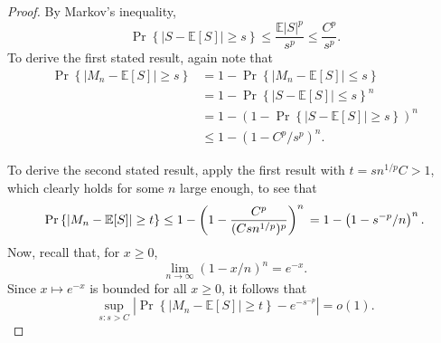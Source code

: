 \documentclass[
  12pt]{article}
\newcommand{\E}{\mathbb{E}}
\theoremstyle{plain}
\theoremstyle{plain}
\theoremstyle{definition}
\theoremstyle{plain}
\theoremstyle{remark}
\begin{document}
\begin{proof}
By Markov's inequality, \[
    \Pr\left\{ |S-\E[S]|\ge s\right\}\le \frac{\E|S|^p}{s^p}\le \frac{C^p}{s^p}.
\] To derive the first stated result, again note that \begin{align*}
\Pr\left\{|M_n-\E[S]|\ge s\right\}
& = 1 -\Pr\left\{|M_n-\E[S]|\le s\right\}               \\
& = 1-\Pr\left\{|S-\E[S]|\le s\right\}^n                \\
& = 1-\left(1-\Pr\left\{|S-\E[S]|\ge s\right\}\right)^n \\
& \le 1-(1-C^p/s^p)^n.
\end{align*}

To derive the second stated result, apply the first result with
\(t=sn^{1/p}C>1\), which clearly holds for some \(n\) large enough, to
see that \[
    \Pr\left\{|M_n-\E[S]|\ge t\right\}
    \le 1- \left(1-\frac{C^p}{(Csn^{1/p})^p}\right)^n \\
    = 1-\left(1-s^{-p}/n\right)^n.
\] Now, recall that, for \(x\ge0\), \[
    \lim_{n\rightarrow\infty}(1-x/n)^n=e^{-x}.
\] Since \(x\mapsto e^{-x}\) is bounded for all \(x\ge0\), it follows
that \[
    \sup_{s:s>C}\left|\Pr\left\{|M_n-\E[S]|\ge t\right\}-e^{-s^{-p}}\right|=o(1).
\]
\end{proof}
\end{document}
